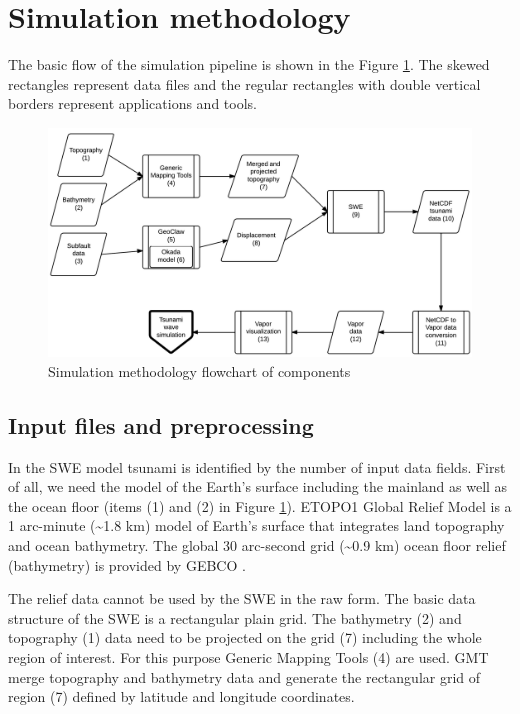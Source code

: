 \documentclass{usiinftr}
\begin{document}
\section{Simulation methodology}
\label{sec:methodology}

The basic flow of the simulation pipeline is shown in the Figure \ref{fig:flowchart}. The skewed rectangles represent data files and the
regular rectangles with double vertical borders represent applications and tools. 

\begin{figure}[H]
\begin{center}
  \includegraphics[width=1\textwidth]{figures/PDCPipeline}
  \caption{Simulation methodology flowchart of components \label{fig:flowchart}}  
\end{center}
\end{figure}

\subsection{Input files and preprocessing}

In the SWE model tsunami is identified by the number of input data fields. First of all,
we need the model of the Earth's surface including the mainland as well as the ocean floor (items (1) and (2) in Figure \ref{fig:flowchart}).
ETOPO1 \cite{etopo1} Global Relief Model is a 1 arc-minute (\textasciitilde 1.8 km) model of Earth's surface that integrates land topography and ocean bathymetry.
The global 30 arc-second grid (\textasciitilde 0.9 km) ocean floor relief (bathymetry) is provided by GEBCO \cite{GEBCO}.

The relief data cannot be used by the SWE in the raw form. The basic data structure of the SWE is a rectangular plain grid. The bathymetry (2)
and topography (1) data need to be projected on the grid (7) including the whole region of interest. For this purpose Generic Mapping Tools (4)
are used. GMT merge topography and bathymetry data and generate the rectangular grid of region (7) defined by latitude and longitude coordinates.
\end{document}
